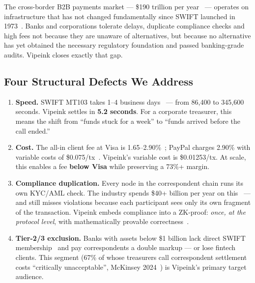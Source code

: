 \documentclass[11pt,a4paper]{article}
\begin{document}
The cross-border B2B payments market --- \$190 trillion per year~\cite{bis_crossborder,mckinsey_payments} --- operates on infrastructure that has not changed fundamentally since SWIFT launched in 1973~\cite{swift_history}. Banks and corporations tolerate delays, duplicate compliance checks and high fees not because they are unaware of alternatives, but because no alternative has yet obtained the necessary regulatory foundation and passed banking-grade audits. Vipeink closes exactly that gap.

\subsection*{Four Structural Defects We Address}

\begin{enumerate}[leftmargin=2em, itemsep=7pt, parsep=0pt]
\item \textbf{Speed.} SWIFT MT103 takes 1--4 business days~\cite{swift_mt103} --- from 86,400 to 345,600 seconds. Vipeink settles in \textbf{5.2 seconds}. For a corporate treasurer, this means the shift from ``funds stuck for a week'' to ``funds arrived before the call ended.''

\item \textbf{Cost.} The all-in client fee at Visa is 1.65--2.90\%~\cite{visa_ar}; PayPal charges 2.90\% with variable costs of \$0.075/tx~\cite{paypal_ar}. Vipeink's variable cost is \$0.01253/tx. At scale, this enables a fee \textbf{below Visa} while preserving a 73\%+ margin.

\item \textbf{Compliance duplication.} Every node in the correspondent chain runs its own KYC/AML check. The industry spends \$40+ billion per year on this~\cite{mckinsey_aml,lexisnexis_aml} --- and still misses violations because each participant sees only its own fragment of the transaction. Vipeink embeds compliance into a ZK-proof: \textit{once, at the protocol level}, with mathematically provable correctness~\cite{fatf_aml_tech}.

\item \textbf{Tier-2/3 exclusion.} Banks with assets below \$1 billion lack direct SWIFT membership~\cite{swift_correspondent,bis_correspondent} and pay correspondents a double markup --- or lose fintech clients. This segment (67\% of whose treasurers call correspondent settlement costs ``critically unacceptable'', McKinsey 2024~\cite{mckinsey_2024}) is Vipeink's primary target audience.
\end{enumerate}
\end{document}
